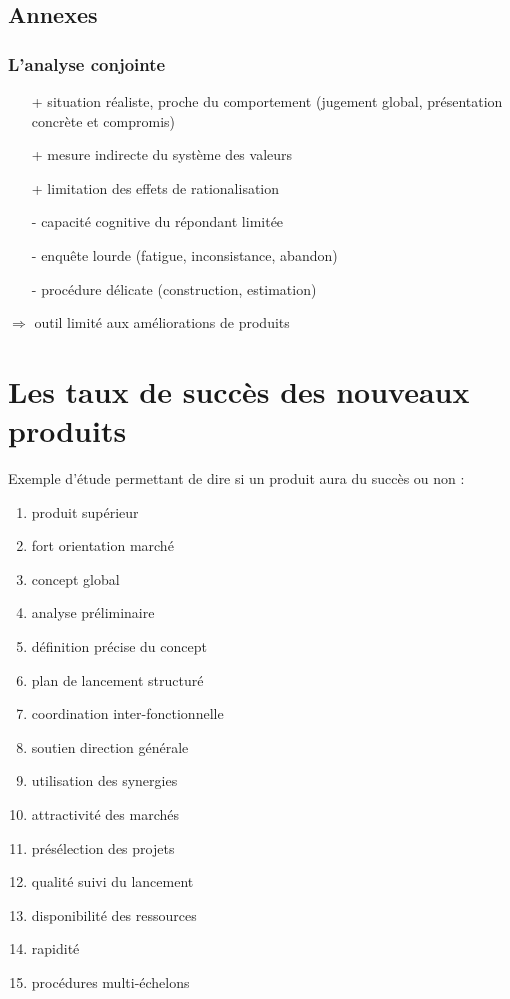 			
		\subsection{Annexes}
			\subsubsection{L'analyse conjointe}
					
			\begin{itemize}
				\item[+] situation réaliste, proche du comportement (jugement global, présentation concrète et compromis)
				\item[+] mesure indirecte du système des valeurs
				\item[+] limitation des effets de rationalisation
				\item[-] capacité cognitive du répondant limitée
				\item[-] enquête lourde (fatigue, inconsistance, abandon)
				\item[-] procédure délicate (construction, estimation)
			\end{itemize}
			
			$\Longrightarrow$ outil limité aux améliorations de produits
								
	\section{Les taux de succès des nouveaux produits}
	
		
	Exemple d'étude permettant de dire si un produit aura du succès ou non :
	
	\begin{enumerate}
		\item produit supérieur
		\item fort orientation marché
		\item concept global
		\item analyse préliminaire
		\item définition précise du concept
		\item plan de lancement structuré
		\item coordination inter-fonctionnelle
		\item soutien direction générale
		\item utilisation des synergies
		\item attractivité des marchés
		\item présélection des projets
		\item qualité suivi du lancement
		\item disponibilité des ressources
		\item rapidité
		\item procédures multi-échelons
	\end{enumerate}
		


